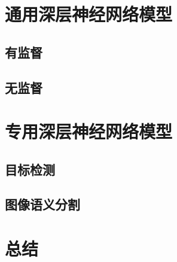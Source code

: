 \documentclass[a4paper, AutoFakeBold]{article}
\begin{document}
\section{通用深层神经网络模型}
\subsection{有监督}
\subsection{无监督}
\section{专用深层神经网络模型}
\subsection{目标检测}
\subsection{图像语义分割}
\section{总结}



\end{document}
